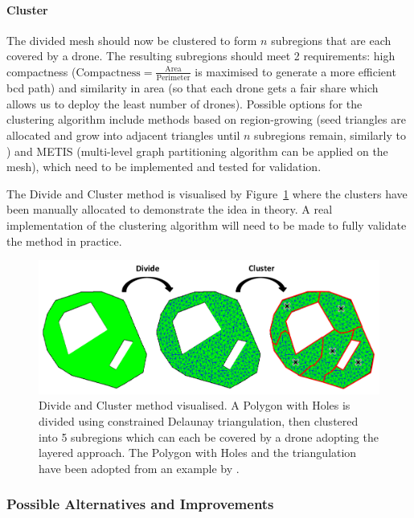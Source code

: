 \paragraph{Cluster} The divided mesh should now be clustered to form $n$ subregions that are each covered by a drone. The resulting subregions should meet 2 requirements: high compactness ($\mathrm{Compactness} = \frac{\mathrm{Area}}{\mathrm{Perimeter}}$ is maximised to generate a more efficient \gls{bcd} path) and similarity in area (so that each drone gets a fair share which allows us to deploy the least number of drones). Possible options for the clustering algorithm include methods based on region-growing (seed triangles are allocated and grow into adjacent triangles until $n$ subregions remain, similarly to \cite{skorobogatov2021multi}) and METIS \cite{karypis1997metis} (multi-level graph partitioning algorithm can be applied on the mesh), which need to be implemented and tested for validation. 

The Divide and Cluster method is visualised by Figure~\ref{fig:msp_divide_cluster} where the clusters have been manually allocated to demonstrate the idea in theory. A real implementation of the clustering algorithm will need to be made to fully validate the method in practice. 

\begin{figure}[h!]
    \centering
    \includegraphics[width=\linewidth]{figs/Jihwan/Divide and Cluster.png}
    \caption[Divide and Cluster Method]
    {Divide and Cluster method visualised. A Polygon with Holes is divided using constrained Delaunay triangulation, then clustered into 5 subregions which can each be covered by a drone adopting the layered approach. The Polygon with Holes and the triangulation have been adopted from an example by \cite{cgal2024triangulation}.}
    \label{fig:msp_divide_cluster}
\end{figure}

\subsubsection{Possible Alternatives and Improvements}

